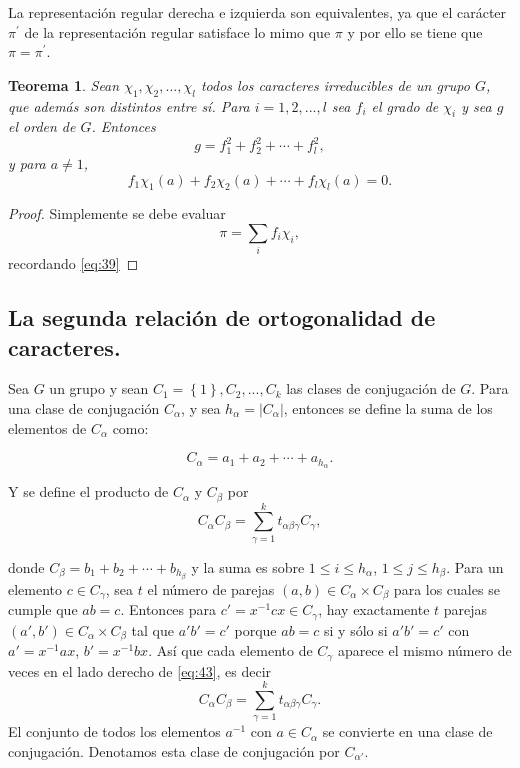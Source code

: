 \documentclass[12pt]{book}
\newtheorem{theorem}{Teorema}[section]
\theoremstyle{definition}
\newcounter{in}
\begin{document}
La representación regular derecha e izquierda son equivalentes, ya que
el carácter $\pi^{'}$ de la representación regular satisface lo mimo
que $\pi$ y por ello se tiene que $\pi = \pi^{'}$.

\begin{theorem}
  \label{t4_8}
  Sean $\chi_{1}, \chi_{2},...,\chi_{l} $ todos
  los caracteres irreducibles de un grupo $G$, que además son distintos
  entre sí. Para $i=1, 2,..., l$ sea $f_{i}$ el grado de $\chi_{i}$ y sea
  $g$ el orden de $G$. Entonces
  \begin{equation*}
    g=f_{1}^{2}+f_{2}^{2}+ \cdots + f_{l}^{2},
  \end{equation*}
  y para $a \neq 1$,
  \begin{equation*}
    f_{1} \chi_{1}(a)+f_{2} \chi_{2}(a)+ \cdots + f_{l} \chi_{l}(a) = 0.
  \end{equation*}
\end{theorem}
\begin{proof}
  Simplemente se debe evaluar
  \begin{equation}
    \label{eq:41}
    \pi=\sum_{i} f_{i} \chi_{i},
  \end{equation}
 recordando \ref{eq:39}
\end{proof}
\subsection{La segunda relación de ortogonalidad de caracteres.}
\label{subsec:sroc}
Sea $G$ un grupo y sean $C_{1}=\left\{1 \right\},C_{2},...,C_{k}$ las
clases de conjugación de $G$. Para una clase de conjugación
$C_{\alpha}$, y sea $h_{\alpha}=|C_{\alpha}|$, entonces se define la
suma de los elementos de $C_{\alpha}$ como:

\begin{equation}
  \label{eq:42}
  C_{\alpha}=a_{1}+a_{2}+ \cdots + a_{h_{\alpha}}.
\end{equation}

Y se define el producto de $C_{\alpha}$ y $C_{\beta}$ por
\begin{equation}
  \label{eq:43}
  C_{\alpha} C_{\beta} = \sum_{\gamma=1}^{k} t_{\alpha \beta \gamma} C_{\gamma},
\end{equation}

donde $C_{\beta}=b_1+b_{2}+ \cdots + b_{h_{\beta}}$ y la suma es sobre
$1 \leq i \leq h_{\alpha}$, $1 \leq j \leq h_{\beta}$. Para un
elemento $c \in C_{\gamma}$, sea $t$ el número de parejas
$(a,b) \in C_{\alpha} \times C_{\beta}$ para los cuales se cumple que $ab=c$. Entonces para
$c'=x^{-1}cx \in C_{\gamma}$, hay exactamente $t$
parejas~$(a',b') \in C_{\alpha} \times C_{\beta}$ tal que $a'b'=c'$
porque $ab=c$ si y sólo si $a'b'=c'$ con $a'=x^{-1}ax$,
$b'=x^{-1}bx$. Así que cada elemento de $C_{\gamma}$ aparece el mismo
número de veces en el lado derecho de \ref{eq:43}, es decir
\begin{equation}
  \label{eq:44}
  C_{\alpha} C_{\beta} = \sum_{\gamma=1}^{k} t_{\alpha \beta \gamma} C_{\gamma}.
\end{equation}
El conjunto de todos los elementos $a^{-1}$ con $a \in C_{\alpha}$ se
convierte en una clase de conjugación. Denotamos esta clase de
conjugación por $C_{\alpha '}$.
\end{document}

